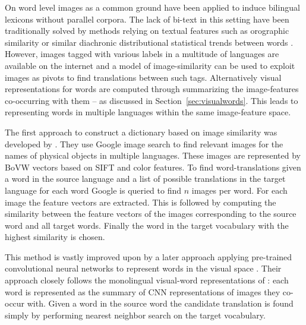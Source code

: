 On word level images as a common ground have been applied to induce bilingual
lexicons without parallel corpora. The lack of bi-text in this setting have
been traditionally solved by methods relying on textual features
such as orographic similarity \citep{haghighi2008learning} or similar diachronic distributional
statistical trends between words \citep{schafer2002inducing}.
However, images tagged with various labels in a multitude of languages are
available on the internet and a model of image-similarity can be used to exploit
images as pivots to find translations between such tags. Alternatively visual representations
for words are computed through summarizing the image-features co-occurring with them
-- as discussed in Section~\ref{sec:visualwords}. This leads to representing
words in multiple languages within the same image-feature space.

The first approach to construct a dictionary based on image similarity was
developed by \cite{bergsma2011learning}. They use Google image search to find
relevant images for the names of physical objects in multiple languages.
These images are represented by BoVW vectors based
on SIFT and color features. To find word-translations given a word in the
source language and a list of possible translations in the target language
for each word Google is queried to find $n$ images per word. For each image the
feature vectors are extracted. This is followed by computing the similarity
between the feature vectors of the images corresponding to the source word and
all target words. Finally the word in the target vocabulary with the highest
similarity is chosen.

This method is vastly improved upon by a later approach applying
pre-trained convolutional neural networks to represent words
in the visual space \citep{kiela2015visual}. Their approach closely follows
the monolingual visual-word representations of \cite{kiela2014improving}:
each word is represented as the summary of CNN representations of images they
co-occur with. Given a word in the source word the candidate translation is found
simply by performing nearest neighbor search on the target vocabulary.

